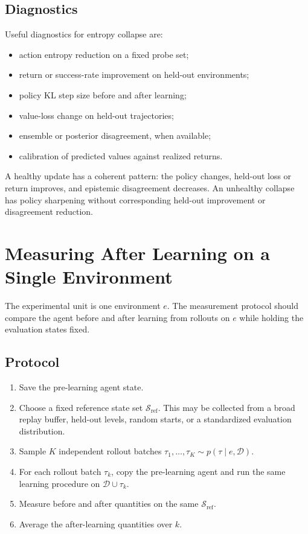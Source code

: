 \documentclass[11pt]{article}
\newcommand{\D}{\mathcal{D}}
\newcommand{\Sref}{\mathcal{S}_{\mathrm{ref}}}
\begin{document}
\subsection{Diagnostics}

Useful diagnostics for entropy collapse are:
\begin{itemize}[leftmargin=*]
  \item action entropy reduction on a fixed probe set;
  \item return or success-rate improvement on held-out environments;
  \item policy KL step size before and after learning;
  \item value-loss change on held-out trajectories;
  \item ensemble or posterior disagreement, when available;
  \item calibration of predicted values against realized returns.
\end{itemize}

A healthy update has a coherent pattern: the policy changes, held-out loss or
return improves, and epistemic disagreement decreases. An unhealthy collapse has
policy sharpening without corresponding held-out improvement or disagreement
reduction.

\section{Measuring After Learning on a Single Environment}

The experimental unit is one environment $e$. The measurement protocol should
compare the agent before and after learning from rollouts on $e$ while holding
the evaluation states fixed.

\subsection{Protocol}

\begin{enumerate}[leftmargin=*]
  \item Save the pre-learning agent state.
  \item Choose a fixed reference state set $\Sref$. This may be collected from a
  broad replay buffer, held-out levels, random starts, or a standardized
  evaluation distribution.
  \item Sample $K$ independent rollout batches
  $\tau_1,\ldots,\tau_K \sim p(\tau \mid e,\D)$.
  \item For each rollout batch $\tau_k$, copy the pre-learning agent and run the
  same learning procedure on $\D \cup \tau_k$.
  \item Measure before and after quantities on the same $\Sref$.
  \item Average the after-learning quantities over $k$.
\end{enumerate}
\end{document}

